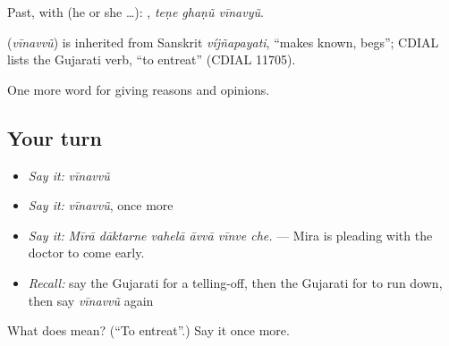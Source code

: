 Past, with  (he or she …):   , \emph{teṇe ghaṇũ vīnavyũ}.

\begin{cousinweb}
\textbf{} (\emph{vīnavvũ}) is inherited from Sanskrit \emph{víjñapayati}, \textquotedblleft{}makes known, begs\textquotedblright{}; CDIAL lists the Gujarati verb, \textquotedblleft{}to entreat\textquotedblright{} (CDIAL 11705).
\end{cousinweb}

\begin{grammarlens}[title={What you've built}]
One more word for giving reasons and opinions.
\end{grammarlens}

\subsection*{Your turn}
\begin{itemize}
\raggedright
  \item \emph{Say it:} \emph{vīnavvũ}
  \item \emph{Say it:} \emph{vīnavvũ}, once more
  \item \emph{Say it:} \emph{Mīrā dāktarne vahelā āvvā vīnve che.} — Mira is pleading with the doctor to come early.
  \item \emph{Recall:} say the Gujarati for a telling-off, then the Gujarati for to run down, then say \emph{vīnavvũ} again
\end{itemize}

\begin{tcolorbox}[breakable,colback=teal!4,colframe=teal!35!black,title={Before you move on}]
What does  mean? (\textquotedblleft{}To entreat\textquotedblright{}.) Say it once more.
\end{tcolorbox}
